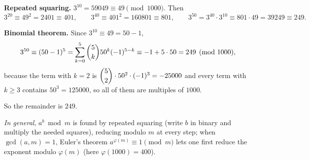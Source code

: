 \textbf{Repeated squaring.} $3^{10}=59049\equiv49\pmod{1000}$. Then
\[3^{20}\equiv49^2=2401\equiv401,\qquad 3^{40}\equiv401^2=160801\equiv801,\qquad 3^{50}=3^{40}\cdot3^{10}\equiv801\cdot49=39249\equiv249 .\]

\textbf{Binomial theorem.} Since $3^{10}\equiv49=50-1$,
\[3^{50}\equiv(50-1)^5=\sum_{k=0}^{5}\dbinom5k50^k(-1)^{5-k}\equiv-1+5\cdot50=249\pmod{1000},\]
because the term with $k=2$ is $\dbinom52\cdot50^2\cdot(-1)^3=-25000$ and every term with $k\ge3$ contains $50^3=125000$, so all of them are multiples of $1000$.

So the remainder is $\boxed{249}$.

\emph{In general}, $a^b\bmod m$ is found by repeated squaring (write $b$ in binary and multiply the needed squares), reducing modulo $m$ at every step; when $\gcd(a,m)=1$, Euler's theorem $a^{\varphi(m)}\equiv1\pmod m$ lets one first reduce the exponent modulo $\varphi(m)$ (here $\varphi(1000)=400$).
